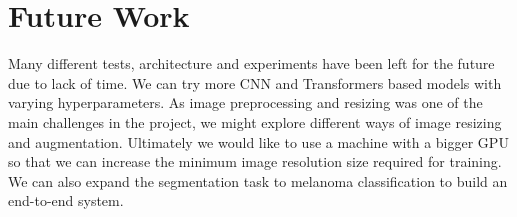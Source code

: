 \section{Future Work}

Many different tests, architecture and experiments have been left for the future due to lack of time. We can try more CNN and Transformers based models with varying  hyperparameters. As image preprocessing and resizing was one of the main challenges in the project, we might explore different ways of image resizing and augmentation. Ultimately we would like to use a machine with a bigger GPU so that we can increase the minimum image resolution size required for training. We can also expand the segmentation task to melanoma classification to build an end-to-end system.
